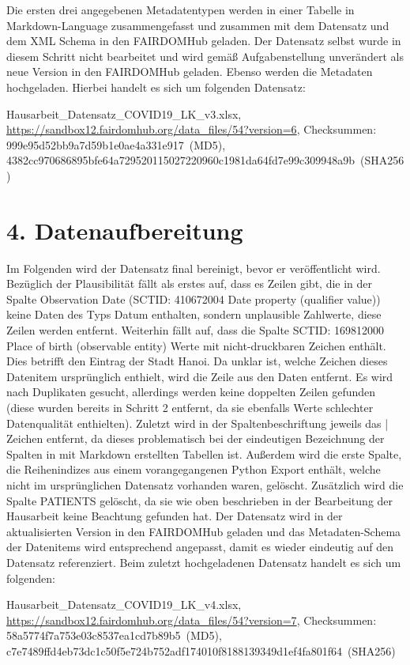 \documentclass[12pt,a4paper,toc=bibliographynumbered,toc=indenttextentries]{scrreprt}
\begin{document}
		Die ersten drei angegebenen Metadatentypen werden in einer Tabelle in Markdown-Language zusammengefasst und zusammen mit dem Datensatz und dem XML Schema in den FAIRDOMHub geladen. Der Datensatz selbst wurde in diesem Schritt nicht bearbeitet und wird gemäß Aufgabenstellung unverändert als neue Version in den FAIRDOMHub geladen. Ebenso werden die Metadaten hochgeladen. Hierbei handelt es sich um folgenden Datensatz:\par
		\textsf{Hausarbeit\_Datensatz\_COVID19\_LK\_v3.xlsx,  \url{https://sandbox12.fairdomhub.org/data_files/54?version=6}, Checksummen: 999e95d52bb9a7d59b1e0ae4a331e917~(MD5), 4382cc970686895bfe64a729520115027220960c1981da64fd7e99c309948a9b~(SHA256)}    
	
		\section*{4. Datenaufbereitung}
		Im Folgenden wird der Datensatz final bereinigt, bevor er veröffentlicht wird. Bezüglich der Plausibilität fällt als erstes auf, dass es Zeilen gibt, die in der Spalte Observation Date (SCTID: 410672004 Date property (qualifier value)) keine Daten des Typs Datum enthalten, sondern unplausible Zahlwerte, diese Zeilen werden entfernt. Weiterhin fällt auf, dass die Spalte SCTID: 169812000 Place of birth (observable entity) Werte mit nicht-druckbaren Zeichen enthält. Dies betrifft den Eintrag der Stadt Hanoi. Da unklar ist, welche Zeichen dieses Datenitem ursprünglich enthielt, wird die Zeile aus den Daten entfernt. Es wird nach Duplikaten gesucht, allerdings werden keine doppelten Zeilen gefunden (diese wurden bereits in Schritt 2 entfernt, da sie ebenfalls Werte schlechter Datenqualität enthielten). Zuletzt wird in der Spaltenbeschriftung jeweils das | Zeichen entfernt, da dieses problematisch bei der eindeutigen Bezeichnung der Spalten in mit Markdown erstellten Tabellen ist. Außerdem wird die erste Spalte, die Reihenindizes aus einem vorangegangenen Python Export enthält, welche nicht im ursprünglichen Datensatz vorhanden waren, gelöscht. Zusätzlich wird die Spalte PATIENTS gelöscht, da sie wie oben beschrieben in der Bearbeitung der Hausarbeit keine Beachtung gefunden hat. Der Datensatz wird in der aktualisierten Version in den FAIRDOMHub geladen und das Metadaten-Schema der Datenitems wird entsprechend angepasst, damit es wieder eindeutig auf den Datensatz referenziert. Beim zuletzt hochgeladenen Datensatz handelt es sich um folgenden:\par
		\textsf{Hausarbeit\_Datensatz\_COVID19\_LK\_v4.xlsx,  \url{https://sandbox12.fairdomhub.org/data_files/54?version=7}, Checksummen: 58a5774f7a753e03c8537ea1cd7b89b5~(MD5), c7e7489ffd4eb73dc1c50f5e724b752adf174010f8188139349d1ef4fa801f64~(SHA256)}
	
\end{document}
